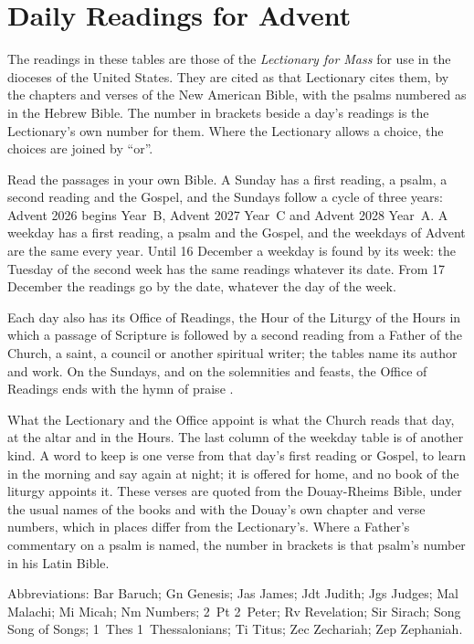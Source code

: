 \section{Daily Readings for Advent}\label{sec:daily}

The readings in these tables are those of the \textit{Lectionary for Mass} for use in the dioceses
of the United States. They are cited as that Lectionary cites them, by the chapters and verses of
the New American Bible, with the psalms numbered as in the Hebrew Bible. The number in brackets
beside a day's readings is the Lectionary's own number for them. Where the Lectionary allows a
choice, the choices are joined by ``or''.

Read the passages in your own Bible. A Sunday has a first reading, a psalm, a second reading and
the Gospel, and the Sundays follow a cycle of three years: Advent 2026 begins Year~B, Advent 2027
Year~C and Advent 2028 Year~A. A weekday has a first reading, a psalm and the Gospel, and the
weekdays of Advent are the same every year. Until 16 December a weekday is found by its week: the
Tuesday of the second week has the same readings whatever its date. From 17 December the readings
go by the date, whatever the day of the week.

Each day also has its Office of Readings, the Hour of the Liturgy of the Hours in which a passage
of Scripture is followed by a second reading from a Father of the Church, a saint, a council or
another spiritual writer; the tables name its author and work. On the Sundays, and on the
solemnities and feasts, the Office of Readings ends with the hymn of praise .

What the Lectionary and the Office appoint is what the Church reads that day, at the altar and in
the Hours. The last column of the weekday table is of another kind. A word to keep is one verse
from that day's first reading or Gospel, to learn in the morning and say again at night; it is
offered for home, and no book of the liturgy appoints it. These verses are quoted from the
Douay-Rheims Bible, under the usual names of the books and with the Douay's own chapter and
verse numbers, which in places differ from the
Lectionary's. Where a Father's commentary on a psalm is named, the number in brackets is that
psalm's number in his Latin Bible.

{\footnotesize\noindent Abbreviations: Bar Baruch; Gn Genesis; Jas James; Jdt Judith; Jgs
Judges; Mal Malachi; Mi Micah; Nm Numbers; 2~Pt 2~Peter; Rv Revelation; Sir Sirach; Song Song of
Songs; 1~Thes 1~Thessalonians; Ti Titus; Zec Zechariah; Zep Zephaniah.\par}

